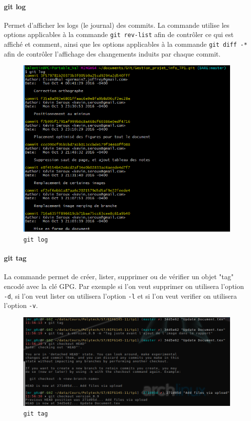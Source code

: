 \documentclass[11pt,canadien]{article}
\begin{document}
\paragraph{git log}Permet d'afficher les logs (le journal) des commits. La commande utilise les options applicables à la commande \texttt{git rev-list} afin de contrôler ce qui est affiché et comment, ainsi que les options applicables à la commande \texttt{git diff -*} afin de contrôler l'affichage des changements induits par chaque commit.
\begin{figure}[h]
	\centering
	\includegraphics[width=\textwidth]{images/git_log.png}
	\caption{\texttt{git log}}
	\label{fig:git_log}
\end{figure}

\paragraph{git tag}La commande permet de créer, lister, supprimer ou de vérifier un objet "tag" encodé avec la clé GPG. Par exemple si l'on veut supprimer on utilisera  l'option \texttt{-d}, si l'on veut lister on utilisera l'option \texttt{-l} et si l'on veut verifier on utilisera l'option \texttt{-v}.
\begin{figure}[h]
	\centering
	\includegraphics[width=\textwidth]{images/git_tag.png}
	\caption{\texttt{git tag}}
	\label{fig:git_tag}
\end{figure}
\end{document}
